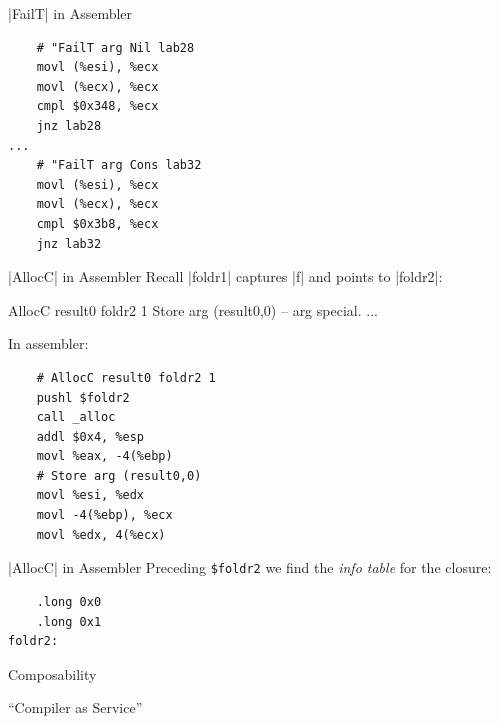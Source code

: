 \documentclass{beamer}
\begin{document}
\begin{frame}{|FailT| in Assembler}
\begin{verbatim}
    # "FailT arg Nil lab28
    movl (%esi), %ecx
    movl (%ecx), %ecx
    cmpl $0x348, %ecx
    jnz lab28
...
    # "FailT arg Cons lab32
    movl (%esi), %ecx
    movl (%ecx), %ecx
    cmpl $0x3b8, %ecx
    jnz lab32

\end{verbatim}


\end{frame}

\begin{frame}{|AllocC| in Assembler}
Recall |foldr1| captures |f| and points to |foldr2|:

  \begin{code}
  AllocC result0 foldr2 1
  Store arg (result0,0) -- arg special.
  ...
  \end{code}

In assembler:

\begin{verbatim}
    # AllocC result0 foldr2 1
    pushl $foldr2
    call _alloc
    addl $0x4, %esp
    movl %eax, -4(%ebp)
    # Store arg (result0,0)
    movl %esi, %edx
    movl -4(%ebp), %ecx
    movl %edx, 4(%ecx)
\end{verbatim}

\end{frame}

\begin{frame}{|AllocC| in Assembler}
Preceding \verb_$foldr2_ we find the \emph{info table} for the closure:
\begin{verbatim}
    .long 0x0
    .long 0x1
foldr2:
\end{verbatim}

\end{frame}

\begin{frame}[fragile]{Composability}

  ``Compiler as Service''

\end{frame}
\end{document}
